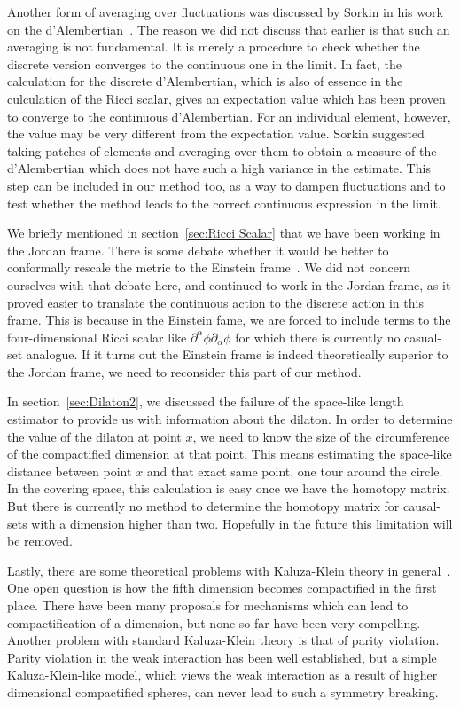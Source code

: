 \documentclass[a4paper,12pt]{article}
\numberwithin{equation}{section}
\begin{document}
Another form of averaging over fluctuations was discussed by Sorkin in his work on the d'Alembertian~\cite{Sorkin2009}. The reason we did not discuss that earlier is that such an averaging is not fundamental. It is merely a procedure to check whether the discrete version converges to the continuous one in the limit. In fact, the calculation for the discrete d'Alembertian, which is also of essence in the culculation of the Ricci scalar, gives an expectation value which has been proven to converge to the continuous d'Alembertian. For an individual element, however, the value may be very different from the expectation value. Sorkin suggested taking patches of elements and averaging over them to obtain a measure of the d'Alembertian which does not have such a high variance in the estimate. This step can be included in our method too, as a way to dampen fluctuations and to test whether the method leads to the correct continuous expression in the limit.

We briefly mentioned in section~\ref{sec:Ricci Scalar} that we have been working in the Jordan frame. There is some debate whether it would be better to conformally rescale the metric to the Einstein frame~\cite{Overduin1997}. We did not concern ourselves with that debate here, and continued to work in the Jordan frame, as it proved easier to translate the continuous action to the discrete action in this frame. This is because in the Einstein fame, we are forced to include terms to the four-dimensional Ricci scalar like $\partial^\alpha \phi \partial_\alpha \phi$ for which there is currently no casual-set analogue. If it turns out the Einstein frame is indeed theoretically superior to the Jordan frame, we need to reconsider this part of our method.

In section~\ref{sec:Dilaton2}, we discussed the failure of the space-like length estimator to provide us with information about the dilaton. In order to determine the value of the dilaton at point $x$, we need to know the size of the circumference of the compactified dimension at that point. This means estimating the space-like distance between point $x$ and that exact same point, one tour around the circle. In the covering space, this calculation is easy once we have the homotopy matrix. But there is currently no method to determine the homotopy matrix for causal-sets with a dimension higher than two. Hopefully in the future this limitation will be removed.

Lastly, there are some theoretical problems with Kaluza-Klein theory in general~\cite{Zee2013}. One open question is how the fifth dimension becomes compactified in the first place. There have been many proposals for mechanisms which can lead to compactification of a dimension, but none so far have been very compelling. Another problem with standard Kaluza-Klein theory is that of parity violation. Parity violation in the weak interaction has been well established, but a simple Kaluza-Klein-like model, which views the weak interaction as a result of higher dimensional compactified spheres, can never lead to such a symmetry breaking.
\end{document}
